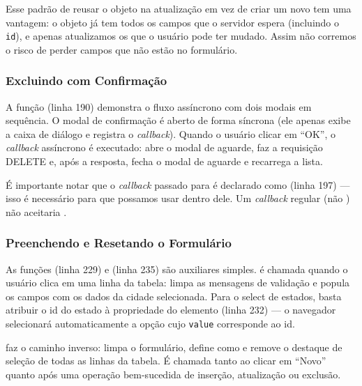 Esse padrão de reusar o objeto  na atualização em vez de criar um novo tem uma vantagem: o objeto já tem todos os campos que o servidor espera (incluindo o \texttt{id}), e apenas atualizamos os que o usuário pode ter mudado. Assim não corremos o risco de perder campos que não estão no formulário.

\subsubsection{Excluindo com Confirmação}

A função  (linha 190) demonstra o fluxo assíncrono com dois modais em sequência. O modal de confirmação é aberto de forma síncrona (ele apenas exibe a caixa de diálogo e registra o \textit{callback}). Quando o usuário clicar em ``OK'', o \textit{callback} assíncrono é executado: abre o modal de aguarde, faz a requisição DELETE e, após a resposta, fecha o modal de aguarde e recarrega a lista.

É importante notar que o \textit{callback} passado para  é declarado como  (linha 197) --- isso é necessário para que possamos usar  dentro dele. Um \textit{callback} regular (não ) não aceitaria .

\subsubsection{Preenchendo e Resetando o Formulário}

As funções  (linha 229) e  (linha 235) são auxiliares simples.  é chamada quando o usuário clica em uma linha da tabela: limpa as mensagens de validação e popula os campos com os dados da cidade selecionada. Para o select de estados, basta atribuir o id do estado à propriedade  do elemento  (linha 232) --- o navegador selecionará automaticamente a opção cujo \texttt{value} corresponde ao id.

 faz o caminho inverso: limpa o formulário, define  como  e remove o destaque de seleção de todas as linhas da tabela. É chamada tanto ao clicar em ``Novo'' quanto após uma operação bem-sucedida de inserção, atualização ou exclusão.

